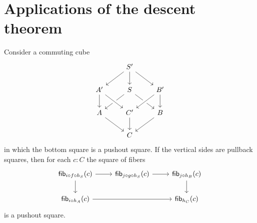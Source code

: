 \section{Applications of the descent theorem}

\begin{thm}
  Consider a commuting cube
  \begin{equation*}
    \begin{tikzcd}
      & S' \arrow[dl] \arrow[dr] \arrow[d] \\
      A' \arrow[d] & S \arrow[dl] \arrow[dr] & B' \arrow[dl,crossing over] \arrow[d] \\
      A \arrow[dr] & C' \arrow[from=ul,crossing over] \arrow[d] & B \arrow[dl] \\
      & C
    \end{tikzcd}
  \end{equation*}
  in which the bottom square is a pushout square. If the vertical sides are pullback squares, then for each $c:C$ the square of fibers
  \begin{equation*}
    \begin{tikzcd}
      \fib{i\circ f\circ h_S}{c} \arrow[d] \arrow[r] & \fib{j\circ g\circ h_S}{c} \arrow[r] & \fib{j\circ h_B}{c} \arrow[d] \\
      \fib{i\circ h_A}{c} \arrow[rr] & & \fib{h_C}{c}
    \end{tikzcd}
  \end{equation*}
  is a pushout square.
\end{thm}

